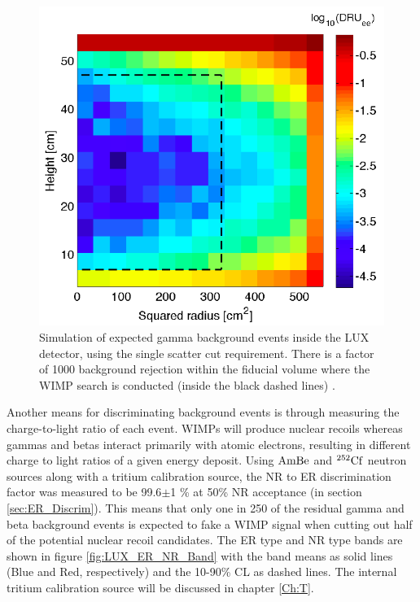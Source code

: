  \begin{figure}[h!]\centering
\includegraphics[scale=.4]{Chapter_LUX_Det/BG_Rejection.png}
\caption{Simulation of expected gamma background events inside the LUX detector, using the single scatter cut requirement\cite{LUX_BG}. There is a factor of 1000 background rejection within the fiducial volume where the WIMP search is conducted (inside the black dashed lines) .}
\label{fig:LUX_BG_Rejection}
\end{figure}

Another means for discriminating background events is through measuring the charge-to-light ratio of each event. WIMPs will produce nuclear recoils whereas gammas and betas interact primarily with atomic electrons, resulting in different charge to light ratios of a given energy deposit. Using $\rm AmBe$ and $\rm ^{252}Cf$ neutron sources along with a tritium calibration source, the NR to ER discrimination factor was measured to be 99.6$\pm$1 \% at 50\% NR acceptance (in section \ref{sec:ER_Discrim}). This means that only one in 250 of the residual gamma and beta background events is expected to fake a WIMP signal when cutting out half of the potential nuclear recoil candidates. The ER type and NR type bands are shown in figure \ref{fig:LUX_ER_NR_Band} with the band means as solid lines (Blue and Red, respectively) and the 10-90\% CL as dashed lines. The internal tritium calibration source will be discussed in chapter \ref{Ch:T}.

